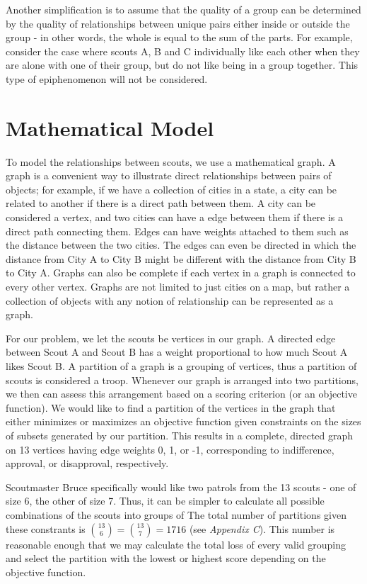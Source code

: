 \documentclass{amsart}
\theoremstyle{definition}
\theoremstyle{remark}
\numberwithin{equation}{section}
\begin{document}
Another simplification is to assume that the quality of a group can be determined by the quality of relationships between unique pairs either inside or outside the group - in other words, the whole is equal to the sum of the parts. For example, consider the case where scouts A, B and C individually like each other when they are alone with one of their group, but do not like being in a group together. This type of epiphenomenon will not be considered.

\section*{Mathematical Model}
To model the relationships between scouts, we use a mathematical graph. A graph is a convenient way to illustrate direct relationships between pairs of objects; for example, if we have a collection of cities in a state, a city can be related to another if there is a direct path between them. A city can be considered a vertex, and two cities can have a edge between them if there is a direct path connecting them. Edges can have weights attached to them such as the distance between the two cities. The edges can even be directed in which the distance from City A to City B might be different with the distance from City B to City A. Graphs can also be complete if each vertex in a graph is connected to every other vertex. Graphs are not limited to just cities on a map, but rather a collection of objects with any notion of relationship can be represented as a graph.

For our problem, we let the scouts be vertices in our graph. A directed edge between Scout A and Scout B has a weight proportional to how much Scout A likes Scout B. A partition of a graph is a grouping of vertices, thus a partition of scouts is considered a troop. Whenever our graph is arranged into two partitions, we then can assess this arrangement based on a scoring criterion (or an objective function). We would like to find a partition of the vertices in the graph that either minimizes or maximizes an objective function given constraints on the sizes of subsets generated by our partition. This results in a complete, directed graph on 13 vertices having edge weights 0, 1, or -1, corresponding to indifference, approval, or disapproval, respectively. 

Scoutmaster Bruce specifically would like two patrols from the 13 scouts - one of size 6, the other of size 7. Thus, it can be simpler to calculate all possible combinations of the scouts into groups of 
The total number of partitions given these constrants is $\binom{13}{6} = \binom{13}{7} = 1716$ (see \textit{Appendix C}). This number is reasonable enough that we may calculate the total loss of every valid grouping and select the partition with the lowest or highest score depending on the objective function.
\end{document}
